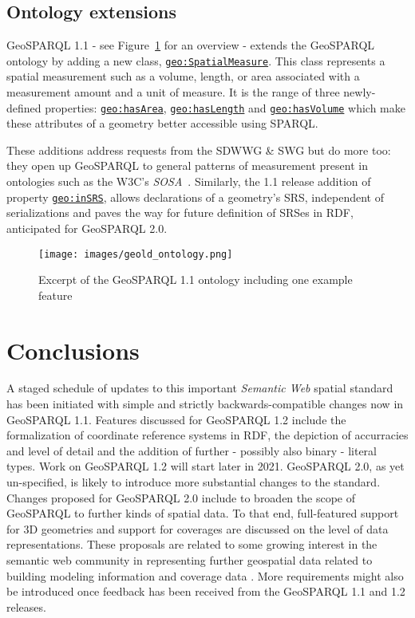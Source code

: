 \documentclass[runningheads]{llncs}
\begin{document}
\subsection{Ontology extensions}\label{sec:ontexts}
GeoSPARQL 1.1 - see Figure~\ref{fig:geosparql11ontology} for an overview - extends the GeoSPARQL ontology by adding a new class, \href{http://www.opengis.net/ont/geosparql#SpatialMeasure}{\texttt{geo:SpatialMeasure}}. This class represents a spatial measurement 
such as a volume, length, or area associated with a measurement amount and a unit of measure. It is the range of three newly-defined properties:
\href{http://www.opengis.net/ont/geosparql#hasArea}{\texttt{geo:hasArea}}, \href{http://www.opengis.net/ont/geosparql#hasLength}{\texttt{geo:hasLength}} and \href{http://www.opengis.net/ont/geosparql#hasVolume}{\texttt{geo:hasVolume}} which make these attributes of a geometry better accessible using 
SPARQL. 

These additions address requests from the SDWWG \& SWG but
do more too: they open up GeoSPARQL to general patterns of measurement present in ontologies 
such as the W3C's \textit{SOSA}~\cite{haller_semantic_2017}. Similarly, 
the 1.1 release addition of property \href{http://www.opengis.net/def/function/geosparql/inSRS}{\texttt{geo:inSRS}}, allows declarations of a geometry's SRS, independent of serializations and paves the way 
for future definition of SRSes in RDF, anticipated for GeoSPARQL 2.0.

\begin{figure}[htb]
    \centering
    \texttt{[image: images/geold\_ontology.png]}
    \caption{Excerpt of the GeoSPARQL 1.1 ontology including one example feature}
    \label{fig:geosparql11ontology}
\end{figure}

\section{Conclusions}\label{sec:conclusions}
A staged schedule of updates to this important \textit{Semantic Web} spatial standard has been initiated with simple and strictly backwards-compatible changes now in GeoSPARQL 1.1. Features discussed for GeoSPARQL 1.2 include the formalization of coordinate reference systems in RDF, the depiction of accurracies and level of detail and the addition of further - possibly also binary - literal types. Work on GeoSPARQL 1.2 will start later in 2021. GeoSPARQL 2.0, as yet un-specified, is likely to introduce more substantial changes to the standard. Changes proposed for GeoSPARQL 2.0 include to broaden the scope of GeoSPARQL to further kinds of spatial data. To that end, full-featured support for 3D geometries and support for coverages are discussed on the level of data representations. These proposals are related to some growing interest in the semantic web community in representing further geospatial data related to building modeling information \cite{zhang2018bimsparql} and coverage data \cite{homburg2020geosparql+}. More requirements might also be introduced once feedback has been received from the GeoSPARQL 1.1 and 1.2 releases.

%
%
%


\end{document}
